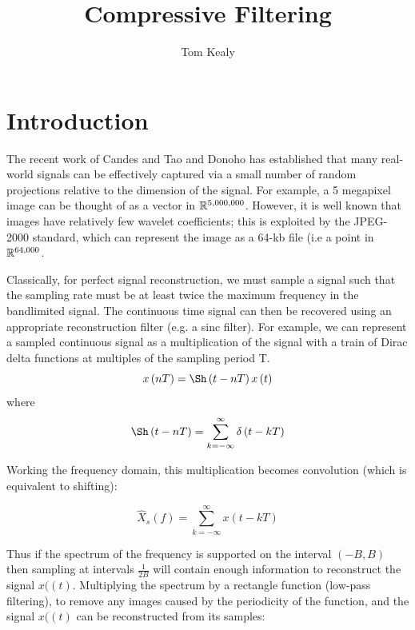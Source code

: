 \documentclass{article}
\title{Compressive Filtering}
\author{Tom Kealy}
\begin{document}
\maketitle

\section{Introduction}

The recent work of Candes and Tao \cite{Candes2006} and Donoho \cite{donoho2006compressed} has established that many real-world signals can be effectively captured via a small number of random projections relative to the dimension of the signal. For example, a 5 megapixel image can be thought of as a vector in \({\mathbb{R}}^{5,000,000}\). However, it is well known that images have relatively few wavelet coefficients; this is exploited by the JPEG-2000 standard, which can represent the image as a 64-kb file (i.e a point in \({\mathbb{R}}^{64,000}\).

Classically, for perfect signal reconstruction, we must sample a signal such that the sampling rate must be at least twice the maximum frequency in the bandlimited signal. The continuous time signal can then be recovered using an appropriate reconstruction filter (e.g. a sinc filter). For example, we can represent a sampled continuous signal as a multiplication of the signal with a train of Dirac delta functions at multiples of the sampling period T.
%
\begin{equation}
x\left(nT\right) = \Sh\left(t-nT\right)x\left(t\right)
\end{equation}
%
where
%
\begin{equation}
\Sh\left(t-nT\right) = \sum_{k=-\infty}^{\infty} \delta\left(t - kT\right)
\end{equation}

Working the frequency domain, this multiplication becomes convolution (which is equivalent to shifting):

\begin{equation}
\hat{X}_{s}\left(f\right) = \sum_{k=-\infty}^\infty x\left(t - kT\right)
\end{equation}

Thus if the spectrum of the frequency is supported on the interval \(\left(-B, B\right)\) then sampling at intervals \(\frac{1}{2B}\) will contain enough information to reconstruct the signal \(x(\left(t\right)\). Multiplying the spectrum by a rectangle function (low-pass filtering), to remove any images caused by the periodicity of the function, and the signal \(x(\left(t\right)\) can be reconstructed from its samples:
\end{document}
